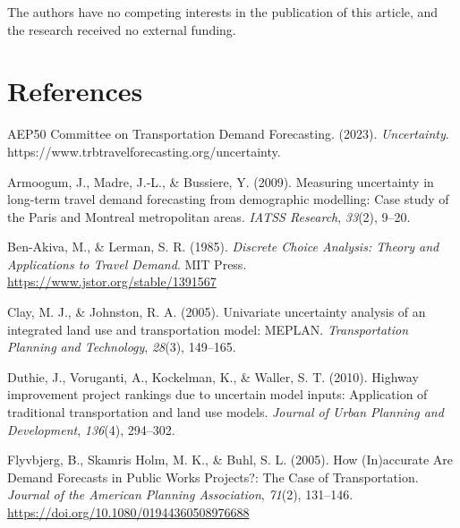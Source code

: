 \documentclass[
  letterpaper,
  authoryear,
  review,
  3p]{elsarticle}
\newlength{\cslhangindent}
\newlength{\cslentryspacingunit} %
\newenvironment{CSLReferences}[2] %
 {%
  \setlength{\parindent}{0pt}
  \ifodd #1
  \let\oldpar\par
  \def\par{\hangindent=\cslhangindent\oldpar}
  \fi
  \setlength{\parskip}{#2\cslentryspacingunit}
 }%
 {}
\begin{document}
The authors have no competing interests in the publication of this
article, and the research received no external funding.


\hypertarget{references}{%
\section*{References}\label{references}}


\hypertarget{refs}{}
\begin{CSLReferences}{1}{0}
\leavevmode{}%
AEP50 Committee on Transportation Demand Forecasting. (2023).
\emph{Uncertainty}. https://www.trbtravelforecasting.org/uncertainty.

\leavevmode{}%
Armoogum, J., Madre, J.-L., \& Bussiere, Y. (2009). Measuring
uncertainty in long-term travel demand forecasting from demographic
modelling: {Case} study of the {Paris} and {Montreal} metropolitan
areas. \emph{IATSS Research}, \emph{33}(2), 9--20.

\leavevmode{}%
Ben-Akiva, M., \& Lerman, S. R. (1985). \emph{Discrete {Choice
Analysis}: {Theory} and {Applications} to {Travel Demand}}. {MIT Press}.
\url{https://www.jstor.org/stable/1391567}

\leavevmode{}%
Clay, M. J., \& Johnston, R. A. (2005). Univariate uncertainty analysis
of an integrated land use and transportation model: {MEPLAN}.
\emph{Transportation Planning and Technology}, \emph{28}(3), 149--165.

\leavevmode{}%
Duthie, J., Voruganti, A., Kockelman, K., \& Waller, S. T. (2010).
Highway improvement project rankings due to uncertain model inputs:
{Application} of traditional transportation and land use models.
\emph{Journal of Urban Planning and Development}, \emph{136}(4),
294--302.

\leavevmode{}%
Flyvbjerg, B., Skamris Holm, M. K., \& Buhl, S. L. (2005). How
({In})accurate {Are Demand Forecasts} in {Public Works Projects}?: {The
Case} of {Transportation}. \emph{Journal of the American Planning
Association}, \emph{71}(2), 131--146.
\url{https://doi.org/10.1080/01944360508976688}


\end{CSLReferences}
\end{document}

